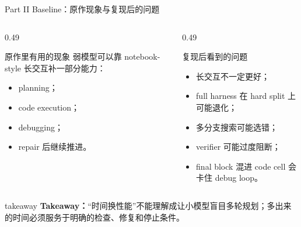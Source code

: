 \documentclass[aspectratio=169,UTF8]{ctexbeamer}
\newcommand{\takeaway}[1]{%
  \vspace{0.35em}
  \begin{beamercolorbox}[wd=\textwidth,sep=0.75ex,rounded=true]{takeaway}
    \textbf{Takeaway：}#1
  \end{beamercolorbox}
}
\begin{document}
\begin{frame}{Part II Baseline：原作现象与复现后的问题}
\begin{columns}[T]
\begin{column}{0.49\textwidth}
\begin{block}{原作里有用的现象}
弱模型可以靠 notebook-style 长交互补一部分能力：
\begin{itemize}
  \item planning；
  \item code execution；
  \item debugging；
  \item repair 后继续推进。
\end{itemize}
\end{block}
\end{column}
\begin{column}{0.49\textwidth}
\begin{alertblock}{复现后看到的问题}
\begin{itemize}
  \item 长交互不一定更好；
  \item full harness 在 hard split 上可能退化；
  \item 多分支搜索可能选错；
  \item verifier 可能过度阻断；
  \item final block 混进 code cell 会卡住 debug loop。
\end{itemize}
\end{alertblock}
\end{column}
\end{columns}
\takeaway{“时间换性能”不能理解成让小模型盲目多轮规划；多出来的时间必须服务于明确的检查、修复和停止条件。}
\end{frame}
\end{document}
